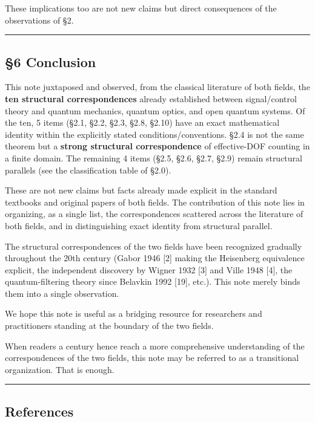 \documentclass[
]{article}
\begin{document}
These implications too are not new claims but direct consequences of the
observations of §2.

\begin{center}\rule{0.5\linewidth}{0.5pt}\end{center}

\subsection{§6 Conclusion}\label{conclusion}

This note juxtaposed and observed, from the classical literature of both
fields, the \textbf{ten structural correspondences} already established
between signal/control theory and quantum mechanics, quantum optics, and
open quantum systems. Of the ten, 5 items (§2.1, §2.2, §2.3, §2.8,
§2.10) have an exact mathematical identity within the explicitly stated
conditions/conventions. §2.4 is not the same theorem but a
\textbf{strong structural correspondence} of effective-DOF counting in a
finite domain. The remaining 4 items (§2.5, §2.6, §2.7, §2.9) remain
structural parallels (see the classification table of §2.0).

These are not new claims but facts already made explicit in the standard
textbooks and original papers of both fields. The contribution of this
note lies in organizing, as a single list, the correspondences scattered
across the literature of both fields, and in distinguishing exact
identity from structural parallel.

The structural correspondences of the two fields have been recognized
gradually throughout the 20th century (Gabor 1946 {[}2{]} making the
Heisenberg equivalence explicit, the independent discovery by Wigner
1932 {[}3{]} and Ville 1948 {[}4{]}, the quantum-filtering theory since
Belavkin 1992 {[}19{]}, etc.). This note merely binds them into a single
observation.

We hope this note is useful as a bridging resource for researchers and
practitioners standing at the boundary of the two fields.

When readers a century hence reach a more comprehensive understanding of
the correspondences of the two fields, this note may be referred to as a
transitional organization. That is enough.

\begin{center}\rule{0.5\linewidth}{0.5pt}\end{center}

\subsection{References}\label{references}
\end{document}
